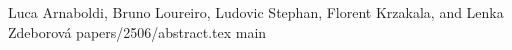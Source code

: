 %
  {Luca Arnaboldi, Bruno Loureiro, Ludovic Stephan, Florent Krzakala, and Lenka Zdeborov\'a}%
  {papers/2506/abstract.tex}
\label{chap:paper-2506}
{\let\appendix\endinput {main}}
